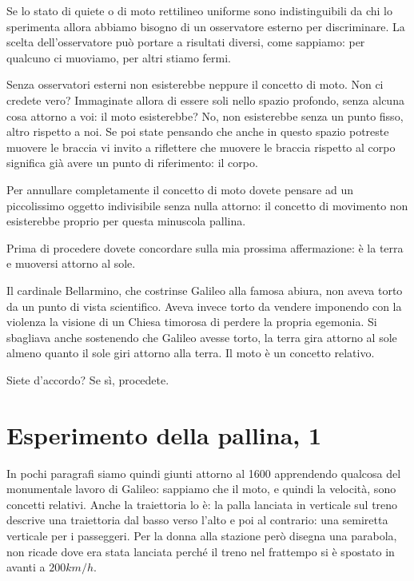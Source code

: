 Se lo stato di quiete o di moto rettilineo uniforme sono indistinguibili da chi lo sperimenta allora abbiamo bisogno di un osservatore esterno per discriminare. La scelta dell’osservatore può portare a risultati diversi, come sappiamo: per qualcuno ci muoviamo, per altri stiamo fermi.

Senza osservatori esterni non esisterebbe neppure il concetto di moto. Non ci credete vero? Immaginate allora di essere soli nello spazio profondo, senza alcuna cosa attorno a voi: il moto esisterebbe? No, non esisterebbe senza un punto fisso, altro rispetto a noi. Se poi state pensando che anche in questo spazio potreste muovere le braccia vi invito a riflettere che muovere le braccia rispetto al corpo significa già avere un punto di riferimento: il corpo.

Per annullare completamente il concetto di moto dovete pensare ad un piccolissimo oggetto indivisibile senza nulla attorno: il concetto di movimento non esisterebbe proprio per questa minuscola pallina.

Prima di procedere dovete concordare sulla mia prossima affermazione: è la terra e muoversi attorno al sole. 

Il cardinale Bellarmino, che costrinse Galileo alla famosa abiura, non aveva torto da un punto di vista scientifico. Aveva invece torto da vendere imponendo con la violenza la visione di un Chiesa timorosa di perdere la propria egemonia. Si sbagliava anche sostenendo che Galileo avesse torto, la terra gira attorno al sole almeno quanto il sole giri attorno alla terra. Il moto è un concetto relativo.

Siete d’accordo? Se sì, procedete.


\section{Esperimento della pallina, 1}

In pochi paragrafi siamo quindi giunti attorno al 1600 apprendendo qualcosa del monumentale lavoro di Galileo: sappiamo che il moto, e quindi la velocità, sono concetti relativi. Anche la traiettoria lo è: la palla lanciata in verticale sul treno descrive una traiettoria dal basso verso l’alto e poi al contrario: una semiretta verticale per i passeggeri. Per la donna alla stazione però disegna una parabola, non ricade dove era stata lanciata perché il treno nel frattempo si è spostato in avanti a $200 km/h$.

